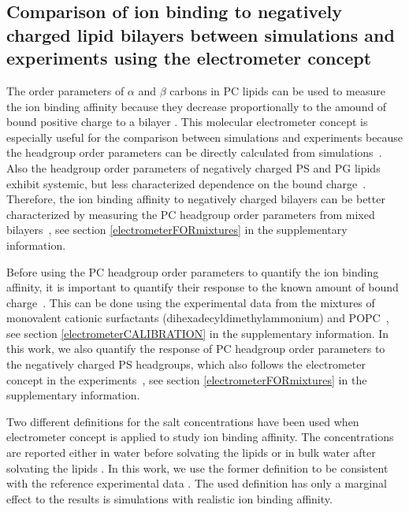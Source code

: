 \documentclass[aps,prl,superscriptaddress,twocolumn]{revtex4}
\begin{document}
\subsection{Comparison of ion binding to negatively charged lipid bilayers 
between simulations and experiments using the electrometer concept}

The order parameters of $\alpha$ and $\beta$ carbons in PC lipids
can be used to measure the ion binding affinity because they 
decrease proportionally to the amound of bound positive
charge to a bilayer \cite{akutsu81,altenbach84,seelig87}.
This molecular electrometer concept is especially useful for 
the comparison between simulations and experiments because
the headgroup order parameters can be directly calculated from 
simulations~\cite{catte16}. Also the headgroup order parameters
of negatively charged PS and PG lipids exhibit systemic, but less
characterized dependence on the bound charge~\cite{borle85,macdonald87,roux86,roux90}.
Therefore, the ion binding affinity to negatively charged bilayers
can be better characterized by measuring the PC headgroup order parameters from 
mixed bilayers~\cite{roux86,roux90,roux91}, see section \ref{electrometerFORmixtures} in the supplementary information.

Before using the PC headgroup order parameters to quantify the ion binding
affinity, it is important to quantify their response to the known amount of bound charge~\cite{catte16,melcr18}.
This can be done using the experimental data from the mixtures of
monovalent cationic surfactants (dihexadecyldimethylammonium) and POPC~\cite{scherer89,melcr18},
see section \ref{electrometerCALIBRATION} in the supplementary information.
In this work, we also quantify the response of PC headgroup order parameters
to the negatively charged PS headgroups, which also follows the electrometer
concept in the experiments~\cite{scherer87},
see section \ref{electrometerFORmixtures} in the supplementary information.

Two different definitions for the salt concentrations have been used when
electrometer concept is applied to study ion binding affinity.
The concentrations are reported either in water before solvating the lipids \cite{akutsu81,roux90,catte16}
or in bulk water after solvating the lipids \cite{altenbach84,melcr18}.
In this work, we use the former definition to be consistent with the reference
experimental data \cite{roux90}. The used definition has only a marginal effect
to the results is simulations with realistic ion binding affinity.
\end{document}
